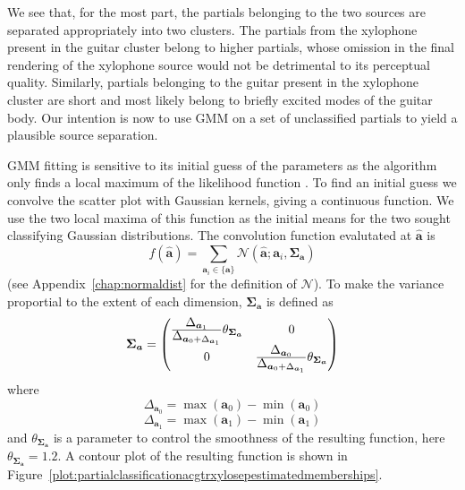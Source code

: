 We see that, for the most part, the partials belonging to the two sources are
separated appropriately into two clusters. The partials from the xylophone
present in the guitar cluster belong to higher partials, whose omission in the
final rendering of the xylophone source would not be detrimental to its
perceptual quality. Similarly, partials belonging to the guitar present in the
xylophone cluster are short and most likely belong to briefly excited modes
of the guitar body. Our intention is now to use GMM on a set of unclassified
partials to yield a plausible source separation.

GMM fitting is sensitive to its initial guess of the parameters as the algorithm
only finds a local maximum of the likelihood function
\cite[p.~187]{kay1993fundamentals}.
To find an initial guess we convolve the scatter plot with Gaussian kernels,
giving a continuous function. We use the two local maxima of this function as
the initial means for the two sought classifying Gaussian distributions. The
convolution function evalutated at $\boldsymbol{\hat{a}}$ is
\[
    f(\boldsymbol{\hat{a}}) = \sum_{\boldsymbol{a}_i \in \{\boldsymbol{a}\}}
    \mathcal{N} \left( \boldsymbol{\hat{a}} ; \boldsymbol{a}_i,
    \boldsymbol{\Sigma}_{\boldsymbol{a}} \right)
\]
(see
Appendix~\ref{chap:normaldist} for the definition of $\mathcal{N}$).
To make the variance proportial to the extent of each dimension,
$\boldsymbol{\Sigma}_{\boldsymbol{a}}$ is defined as
\[
    \boldsymbol{\Sigma}_{\boldsymbol{a}}
    =
    \begin{pmatrix}
        \frac{\displaystyle\Delta_{\boldsymbol{a}_1}}{\displaystyle\Delta_{\boldsymbol{a}_0
        +\Delta_{\boldsymbol{a}_1}}}
            \theta_{\boldsymbol{\Sigma_{\boldsymbol{a}}}}
        & 0 \\
        0 & \frac{\displaystyle\Delta_{\boldsymbol{a}_0}}{\displaystyle\Delta_{\boldsymbol{a}_0
    +\Delta_{\boldsymbol{a}_1}}}
            \theta_{\boldsymbol{\Sigma_{\boldsymbol{a}}}}
    \end{pmatrix}
\]
where
\[
    \Delta_{\boldsymbol{a}_0} = \max \left( \boldsymbol{a}_0 \right)
        - \min \left( \boldsymbol{a}_0 \right)
\]
\[
    \Delta_{\boldsymbol{a}_1} = \max \left( \boldsymbol{a}_1 \right)
        - \min \left( \boldsymbol{a}_1 \right)
\]
and $\theta_{\boldsymbol{\Sigma_{\boldsymbol{a}}}}$ is a parameter to control
the smoothness of the resulting function, here
$\theta_{\boldsymbol{\Sigma_{\boldsymbol{a}}}} = 1.2$. A contour plot of the
resulting function is shown in
Figure~\ref{plot:partialclassificationacgtrxylosepestimatedmemberships}.

